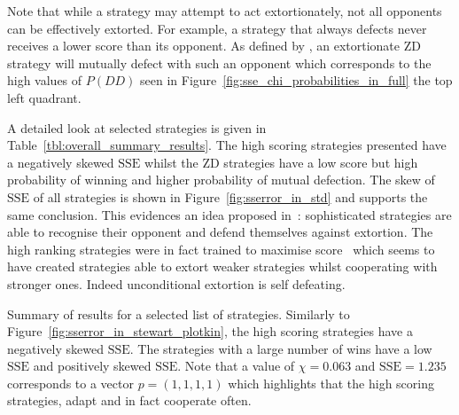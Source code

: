 \documentclass[a4paper]{article}
\newcommand{\SSe}{\text{SSE}}
\begin{document}
Note that while a strategy may attempt to act extortionately, not all opponents
can be effectively extorted. For example, a strategy that always defects never
receives a lower score than its opponent. As defined by \cite{Press2012}, an
extortionate ZD strategy will mutually defect with such an opponent which
corresponds to the high values of \(P(DD)\) seen in
Figure~\ref{fig:sse_chi_probabilities_in_full} the top left quadrant.

A detailed look at selected strategies is given in
Table~\ref{tbl:overall_summary_results}. The high scoring strategies presented
have a negatively skewed \(\SSe\) whilst the ZD strategies have a low score but
high probability of winning and higher probability of mutual defection.
The skew of \(\SSe\) of all strategies is shown in
Figure~\ref{fig:sserror_in_std} and supports the
same conclusion. This evidences an idea proposed
in~\cite{adami2013evolutionary}: sophisticated strategies are able to recognise
their opponent and defend themselves against extortion.  The high ranking
strategies were in fact trained to maximise score~\cite{Harper2017} which seems
to have created strategies able to extort weaker strategies whilst cooperating
with stronger ones. Indeed unconditional extortion is self defeating.

\begin{table}[!hbtp]
    \begin{center}
    \small
    
    \end{center}
    \caption{Summary of results for a selected list of strategies. Similarly to
        Figure~\ref{fig:sserror_in_stewart_plotkin}, the high scoring strategies
        have a negatively skewed \(\SSe\). The strategies with a
        large number of wins have a low \(\SSe\) and positively skewed
        \(\SSe\). Note that a value of \(\chi=0.063\) and \(\SSe=1.235\)
        corresponds to a vector \(p=(1,1,1,1)\) which highlights that the high
        scoring strategies, adapt and in fact cooperate often.}
    \label{tbl:overall_summary_results}
\end{table}
\end{document}
